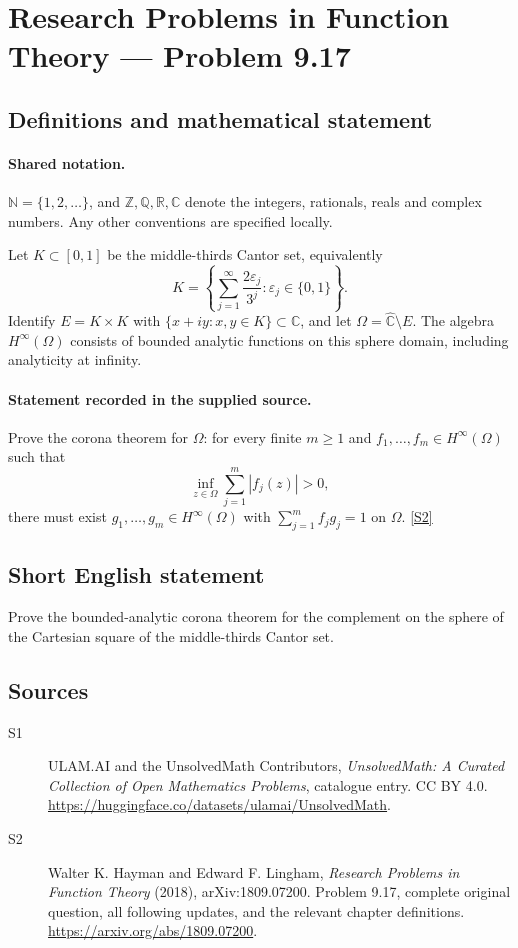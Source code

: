\documentclass[11pt]{book}
\newcommand{\sref}[2]{\hyperlink{source:#1:#2}{[S#2]}}
\begin{document}
\section{Research Problems in Function Theory — Problem 9.17}\label{statement}

\subsection{Definitions and mathematical statement}

\paragraph{Shared notation.}$\mathbb N=\{1,2,\ldots\}$, and $\mathbb Z,\mathbb Q,\mathbb R,\mathbb C$ denote the integers, rationals, reals and complex numbers. Any other conventions are specified locally.


Let $K\subset[0,1]$ be the middle-thirds Cantor set, equivalently \[K=\left\{\sum_{j=1}^{\infty}\frac{2\varepsilon_j}{3^j}:\varepsilon_j\in\{0,1\}\right\}.\] Identify $E=K\times K$ with $\{x+iy:x,y\in K\}\subset\mathbb C$, and let $\Omega=\widehat{\mathbb C}\setminus E$. The algebra $H^{\infty}(\Omega)$ consists of bounded analytic functions on this sphere domain, including analyticity at infinity.
\paragraph{Statement recorded in the supplied source.}
Prove the corona theorem for $\Omega$: for every finite $m\ge1$ and $f_1,\ldots,f_m\in H^{\infty}(\Omega)$ such that \[\inf_{z\in\Omega}\sum_{j=1}^m|f_j(z)|>0,\] there must exist $g_1,\ldots,g_m\in H^{\infty}(\Omega)$ with $\sum_{j=1}^mf_jg_j=1$ on $\Omega$. \sref{statement}{2}
\subsection{Short English statement}
Prove the bounded-analytic corona theorem for the complement on the sphere of the Cartesian square of the middle-thirds Cantor set.
\subsection{Sources}
\begin{description}
\item[\hypertarget{source:statement:1}{S1}] ULAM.AI and the UnsolvedMath Contributors, \emph{UnsolvedMath: A Curated Collection of Open Mathematics Problems}, catalogue entry. CC BY 4.0. \url{https://huggingface.co/datasets/ulamai/UnsolvedMath}.
\item[\hypertarget{source:statement:2}{S2}] Walter K. Hayman and Edward F. Lingham, \emph{Research Problems in Function Theory} (2018), arXiv:1809.07200. Problem 9.17, complete original question, all following updates, and the relevant chapter definitions. \url{https://arxiv.org/abs/1809.07200}.
\end{description}
\label{end:statement}
\end{document}
